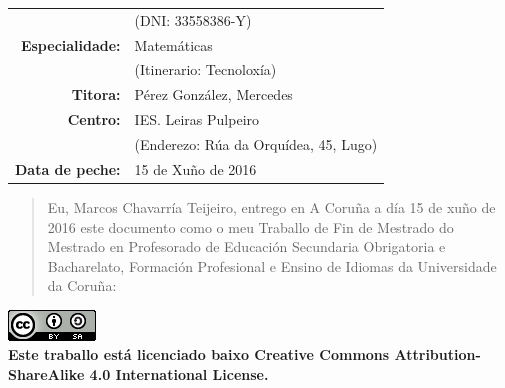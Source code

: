 \begin{titlepage}
\begin{bottompar}
\begin{flushright}
\begin{tabular}{rl}
        & \small{(DNI: 33558386-Y)} \\

        \large{\textbf{Especialidade:}}
        & \large{Matemáticas} \\

        & \small{(Itinerario: Tecnoloxía)} \\


        \large{\textbf{Titora:}}
        & \large{Pérez González, Mercedes} \\

        \large{\textbf{Centro:}}
        & \large{IES. Leiras Pulpeiro} \\

        & \small{(Enderezo: Rúa da Orquídea, 45, Lugo)} \\

        \large{\textbf{Data de peche:}}
        & \large{15 de Xuño de 2016} \\
      \end{tabular}
    \end{flushright}
  \end{bottompar}

    \newpage

    \begin{center}
        \begin{quote}
            Eu, Marcos Chavarría Teijeiro, entrego en A Coruña a día 15 de xuño de 2016 este documento como o meu Traballo de Fin de Mestrado do Mestrado en Profesorado de Educación Secundaria Obrigatoria e Bacharelato, Formación Profesional e Ensino de Idiomas da Universidade da Coruña:
        \end{quote}

        \begin{bottompar}
          \includegraphics{img/cclicence.png} \\

          \textbf{Este traballo está licenciado baixo Creative Commons Attribution-ShareAlike 4.0 International License.}
        \end{bottompar}
    \end{center}

\end{titlepage}
